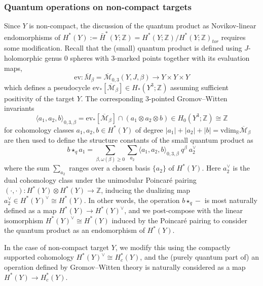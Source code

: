 \documentclass[reqno]{amsart}
\numberwithin{equation}{section}
\numberwithin{equation}{section}
\numberwithin{equation}{section}
\theoremstyle{definition}
\theoremstyle{remark}
\theoremstyle{remark}
\begin{document}
\subsubsection{Quantum operations on non-compact targets}
Since $Y$ is non-compact, the discussion of the quantum product as Novikov-linear endomorphisms of $H^*(Y) := \bar{H}^*(Y;\mathbb{Z}) = H^*(Y;\mathbb{Z})/H^*(Y;\mathbb{Z})_{tor}$ requires some modification. Recall that the (small) quantum product is defined using $J$-holomorphic genus $0$ spheres with $3$-marked points together with its evaluation maps,
\begin{equation}
    \mathrm{ev}: \overline{M}_{\beta} = \overline{\mathcal{M}}_{0,3} (Y,J,\beta) \to Y \times Y \times Y
\end{equation}
which defines a pseudocycle $\mathrm{ev}_*[\overline{\mathcal{M}}_{\beta}] \in H_*(Y^3;\mathbb{Z})$ assuming sufficient positivity of the target $Y$. The corresponding 3-pointed Gromov--Witten invariants
\begin{equation}
    \langle a_1, a_2, b \rangle_{0, 3, \beta} = \mathrm{ev}_*[\overline{\mathcal{M}}_{\beta}] \cap (a_1 \otimes a_2 \otimes b ) \in H_0(Y^3;\mathbb{Z}) \cong \mathbb{Z}
\end{equation}
for cohomology classes $a_1, a_2, b \in H^*(Y)$ of degree $|a_1| + |a_2| + |b| = \mathrm{vdim}_{\mathbb{R}} \overline{\mathcal{M}}_{\beta}$ are then used to define the structure constants of the small quantum product as
\begin{equation}
    b \star_q  a_1 = \sum_{\beta, \omega(\beta) \ge 0} \sum_{a_2} \langle a_1, a_2, b \rangle_{0, 3, \beta} \ q^\beta \ a_2^\vee
\end{equation}
where the sum $\sum_{a_2}$ ranges over a chosen basis $\{a_2\}$ of $H^*(Y)$. Here $a_2^\vee$ is the dual cohomology class under the unimodular Poincar\'e pairing $(\cdot, \cdot) : H^*(Y) \otimes H^*(Y) \to \mathbb{Z}$, inducing the dualizing map $a_2^\vee \in H^*(Y)^\vee \cong H^*(Y)$. In other words, the operation $b \star_q -$ is most naturally defined as a map $H^*(Y) \to H^*(Y)^\vee$, and we post-compose with the linear isomorphism $H^*(Y)^\vee \cong H^*(Y)$ induced by the Poincar\'e pairing to consider the quantum product as an endomorphism of $H^*(Y)$.

In the case of non-compact target $Y$, we modify this using the compactly supported cohomology $H^*(Y)^\vee \cong H^*_c(Y)$, and the (purely quantum part of) an operation defined by Gromov--Witten theory is naturally considered as a map $H^*(Y) \to H^*_c(Y)$.
\end{document}
